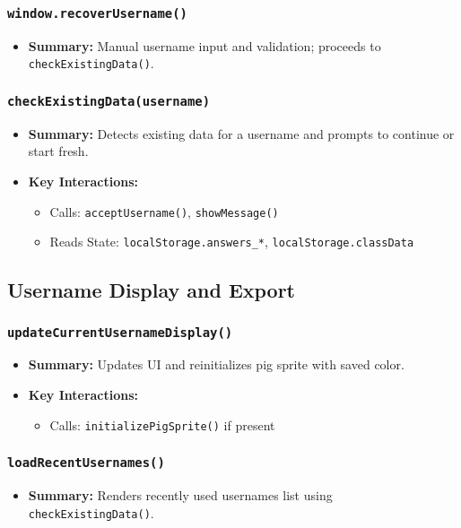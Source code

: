 \documentclass[11pt,letterpaper]{article}
\begin{document}
\subsubsection{\texttt{window.recoverUsername()}}
\begin{itemize}
    \item \textbf{Summary:} Manual username input and validation; proceeds to \texttt{checkExistingData()}.
\end{itemize}

\subsubsection{\texttt{checkExistingData(username)}}
\begin{itemize}
    \item \textbf{Summary:} Detects existing data for a username and prompts to continue or start fresh.
    \item \textbf{Key Interactions:}
    \begin{itemize}
        \item Calls: \texttt{acceptUsername()}, \texttt{showMessage()}
        \item Reads State: \texttt{localStorage.answers\_*}, \texttt{localStorage.classData}
    \end{itemize}
\end{itemize}

\subsection{Username Display and Export}

\subsubsection{\texttt{updateCurrentUsernameDisplay()}}
\begin{itemize}
    \item \textbf{Summary:} Updates UI and reinitializes pig sprite with saved color.
    \item \textbf{Key Interactions:}
    \begin{itemize}
        \item Calls: \texttt{initializePigSprite()} if present
    \end{itemize}
\end{itemize}

\subsubsection{\texttt{loadRecentUsernames()}}
\begin{itemize}
    \item \textbf{Summary:} Renders recently used usernames list using \texttt{checkExistingData()}.
\end{itemize}
\end{document}
